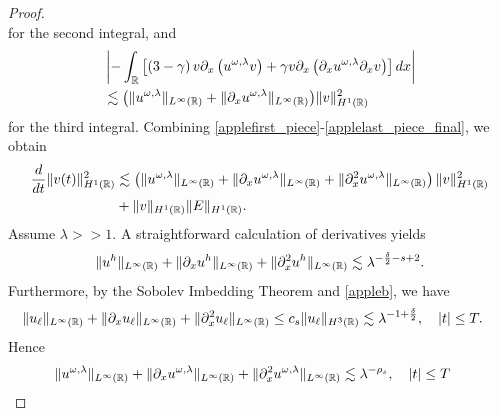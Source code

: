 \begin{proof}
\begin{equation}
\end{equation}
for the second integral, and
\begin{equation}
\begin{split}
\label{applelast_piece_final}
& \left | -\int_{\mathbb{R}} \left[ \left( 3-\gamma \right)v
\partial_x \left( u^{\omega,\lambda} v \right) + \gamma
v \partial_x \left( \partial_x u^{\omega,\lambda} \partial_x v \right)\right]dx \right |
\\
& \lesssim \big(
\|u^{\omega,\lambda}\|_{L^\infty(\mathbb{R})}
+ \|\partial_x u^{\omega,\lambda} \|_{L^\infty(\mathbb{R})} \big)
\|v\|_{H^1(\mathbb{R})}^2
\end{split}
\end{equation}
%
%
%
for the third integral. Combining 
\eqref{applefirst_piece}-\eqref{applelast_piece_final}, we 
obtain
%
%
\begin{equation}
\begin{split}
\label{appleenergy-estimate-best}
\frac{d}{dt} \|v(t)\|_{H^1(\mathbb{R})}^2
& \lesssim \left( \|u^{\omega,\lambda}\|_{L^\infty(\mathbb{R})} + \|
\partial_x u^{\omega,\lambda} \|_{L^\infty(\mathbb{R})} + \|\partial_x^2 u^{\omega,\lambda} 
\|_{L^\infty (\mathbb{R})} \right)
\|v\|_{H^1(\mathbb{R})}^2 \\
&+ \|v\|_{H^1(\mathbb{R})} \|E\|_{H^1(\mathbb{R})}.
\end{split}
\end{equation}
%
%
Assume $\lambda >>1$. A straightforward calculation of derivatives yields
%
%
\begin{equation*}
\begin{split}
\|u^h\|_{L^\infty(\mathbb{R})} + \|\partial_x u^h\|_{L^\infty(\mathbb{R})} + \|\partial_x^2
u^h\|_{L^\infty(\mathbb{R})} \lesssim \lambda^{- \frac{\delta}{2} - s +2 }.
\label{apple53}
\end{split}
\end{equation*}
%
%
Furthermore, by the Sobolev Imbedding Theorem and \cref{appleb}, we have
%
%
%
%
\begin{equation*}
\begin{split}
\|u_\ell\|_{L^\infty(\mathbb{R})} + \|\partial_x u_\ell \|_{L^\infty(\mathbb{R})} + \|\partial_x^2
u_\ell\|_{L^\infty(\mathbb{R})}
& \le c_s \|u_\ell\|_{H^3(\mathbb{R})} 
\lesssim \lambda^{-1 + \frac{\delta}{2}}, 
\quad |t| \le T.
\label{apple55}
\end{split}
\end{equation*}
%
%
Hence
%
%
\begin{equation}
\begin{split}
\|u^{\omega,\lambda}\|_{L^\infty(\rr)} + \|\p_x 
u^{\omega,\lambda}\|_{L^\infty(\rr)} + \|\p_x^2
u^{\omega,\lambda}\|_{L^\infty(\rr)}
& \lesssim \lambda^{-\rho_s}, \quad |t| \le T

\end{split}
\end{equation}
\end{proof}

